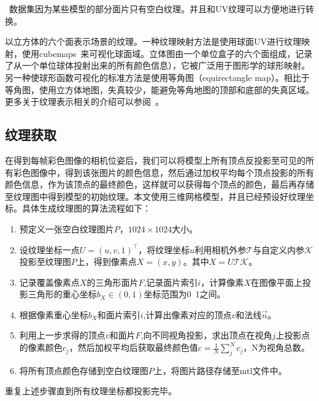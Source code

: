 ~\cite{shapenet2015}数据集因为某些模型的部分面片只有空白纹理。并且和UV纹理可以方便地进行转换。\par
\vspace*{2mm}以立方体的六个面表示场景的纹理。一种纹理映射方法是使用球面UV进行纹理映射，使用cubemaps~\cite{greene1986environment}来可视化球面域。立体图由一个单位盒子的六个面组成，记录了从一个单位球体投射出来的所有颜色信息），它被广泛用于图形学的球形映射。另一种使球形函数可视化的标准方法是使用等角图（equirectangle map）。相比于等角图，使用立方体地图，失真较少，能避免等角地图的顶部和底部的失真区域。更多关于纹理表示相关的介绍可以参阅~\cite{tarini2017rethinking,yuksel2019rethinking}。\par
\subsection{纹理获取}
在得到每帧彩色图像的相机位姿后，我们可以将模型上所有顶点反投影至可见的所有彩色图像中，得到该张图片的颜色信息，然后通过加权平均每个顶点投影的所有颜色信息，作为该顶点的最终颜色，这样就可以获得每个顶点的颜色，最后再存储至纹理图中得到模型的初始纹理。本文使用三维网格模型，并且已经预设好纹理坐标。具体生成纹理图的算法流程如下：\par




\begin{enumerate}[label=(\arabic*)]
    \item 预定义一张空白纹理图片$P$，$1024 \times 1024$大小。
    \item 设纹理坐标一点$U = (u,v,1)^\top$，将纹理坐标$u$利用相机外参$\mathcal{T}$与自定义内参$\mathcal{K}$投影至纹理图$P$上，得到像素点$X=(x,y)$。其中$X = U\mathcal{T}\mathcal{K}$。
    \item 记录覆盖像素点$X$的三角形面片$F$,记录面片索引$i$，计算像素$X$在图像平面上投影三角形的重心坐标$b_X\in(0,1)$坐标范围为0~1之间。
    \item 根据像素重心坐标$b_X$和面片索引$i$,计算出像素对应的顶点$v$和法线$\vec{n}$。
    \item 利用上一步求得的顶点$v$和面片$F$,向不同视角投影，求出顶点在视角$j$上投影点的像素颜色$c_j$，然后加权平均后获取最终颜色值$c= \frac{1}{N}  \sum_j^N c_j $，N为视角总数。
    \item 将所有顶点颜色存储到空白纹理图$P$上，将图片路径存储至mtl文件中。
\end{enumerate}
重复上述步骤直到所有纹理坐标都投影完毕。


